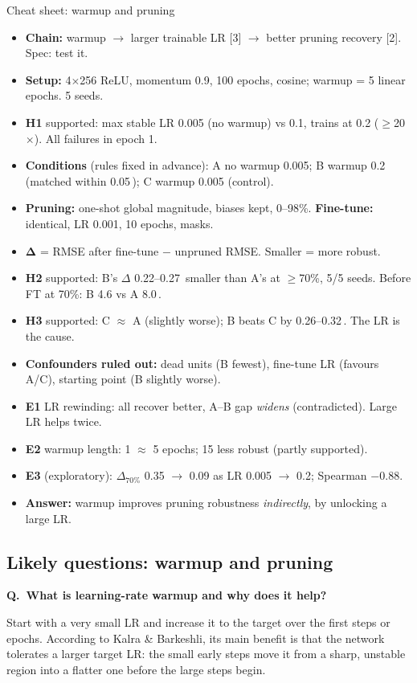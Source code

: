 \documentclass[11pt,a4paper]{article}
\newcommand{\A}{\,\text{\AA}}
\newcounter{qnum}
\newcommand{\Q}[1]{\refstepcounter{qnum}\par\medskip\noindent\textbf{Q\theqnum.\ #1}\par\nopagebreak\noindent\ignorespaces}
\begin{document}
\begin{cheat}{Cheat sheet: warmup and pruning}
\begin{itemize}
  \item \textbf{Chain:} warmup $\to$ larger trainable LR [3] $\to$ better pruning recovery [2]. Spec: test it.
  \item \textbf{Setup:} 4$\times$256 ReLU, momentum 0.9, 100 epochs, cosine; warmup = 5 linear epochs. 5 seeds.
  \item \textbf{H1} supported: max stable LR 0.005 (no warmup) vs 0.1, trains at 0.2 ($\geq$20$\times$). All failures in epoch 1.
  \item \textbf{Conditions} (rules fixed in advance): A no warmup 0.005; B warmup 0.2 (matched within 0.05\A); C warmup 0.005 (control).
  \item \textbf{Pruning:} one-shot global magnitude, biases kept, 0--98\%. \textbf{Fine-tune:} identical, LR 0.001, 10 epochs, masks.
  \item $\boldsymbol{\Delta}$ = RMSE after fine-tune $-$ unpruned RMSE. Smaller = more robust.
  \item \textbf{H2} supported: B's $\Delta$ 0.22--0.27\A{} smaller than A's at $\geq$70\%, 5/5 seeds. Before FT at 70\%: B 4.6 vs A 8.0\A.
  \item \textbf{H3} supported: C $\approx$ A (slightly worse); B beats C by 0.26--0.32\A. The LR is the cause.
  \item \textbf{Confounders ruled out:} dead units (B fewest), fine-tune LR (favours A/C), starting point (B slightly worse).
  \item \textbf{E1} LR rewinding: all recover better, A--B gap \emph{widens} (contradicted). Large LR helps twice.
  \item \textbf{E2} warmup length: 1 $\approx$ 5 epochs; 15 less robust (partly supported).
  \item \textbf{E3} (exploratory): $\Delta_{70\%}$ 0.35 $\to$ 0.09 as LR 0.005 $\to$ 0.2; Spearman $-0.88$.
  \item \textbf{Answer:} warmup improves pruning robustness \emph{indirectly}, by unlocking a large LR.
\end{itemize}
\end{cheat}

\subsection{Likely questions: warmup and pruning}

\Q{What is learning-rate warmup and why does it help?}
Start with a very small LR and increase it to the target over the first steps or epochs. According to Kalra \&
Barkeshli, its main benefit is that the network tolerates a larger target LR: the small early steps move it from a sharp,
unstable region into a flatter one before the large steps begin.
\end{document}
